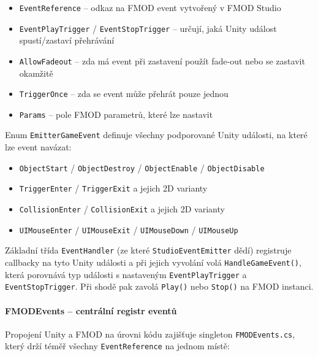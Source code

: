 \begin{itemize}
    \item \texttt{EventReference} -- odkaz na FMOD event vytvořený v FMOD Studio
    \item \texttt{EventPlayTrigger} / \texttt{EventStopTrigger} -- určují, jaká Unity událost spustí/zastaví přehrávání
    \item \texttt{AllowFadeout} -- zda má event při zastavení použít fade-out nebo se zastavit okamžitě
    \item \texttt{TriggerOnce} -- zda se event může přehrát pouze jednou
    \item \texttt{Params} -- pole FMOD parametrů, které lze nastavit
\end{itemize}

Enum \texttt{EmitterGameEvent} definuje všechny podporované Unity události, na které lze event navázat:

\begin{itemize}
    \item \texttt{ObjectStart} / \texttt{ObjectDestroy} / \texttt{ObjectEnable} / \texttt{ObjectDisable}
    \item \texttt{TriggerEnter} / \texttt{TriggerExit} a jejich 2D varianty
    \item \texttt{CollisionEnter} / \texttt{CollisionExit} a jejich 2D varianty
    \item \texttt{UIMouseEnter} / \texttt{UIMouseExit} / \texttt{UIMouseDown} / \texttt{UIMouseUp}
\end{itemize}

Základní třída \texttt{EventHandler} (ze které \texttt{StudioEventEmitter} dědí) registruje callbacky na tyto Unity události a při jejich vyvolání volá \texttt{HandleGameEvent()}, která porovnává typ události s nastaveným \texttt{EventPlayTrigger} a \texttt{EventStopTrigger}. Při shodě pak zavolá \texttt{Play()} nebo \texttt{Stop()} na FMOD instanci.

\newpage

\paragraph{FMODEvents -- centrální registr eventů}
Propojení Unity a FMOD na úrovni kódu zajišťuje singleton \texttt{FMODEvents.cs}, který drží téměř všechny \texttt{EventReference} na jednom místě:

